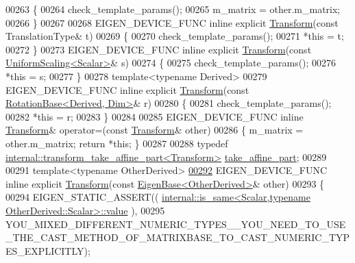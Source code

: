 \begin{DoxyCode}
00263   \{
00264     check\_template\_params();
00265     m\_matrix = other.m\_matrix;
00266   \}
00267 
00268   EIGEN\_DEVICE\_FUNC \textcolor{keyword}{inline} \textcolor{keyword}{explicit} \hyperlink{group___geometry___module_class_eigen_1_1_transform}{Transform}(\textcolor{keyword}{const} TranslationType& t)
00269   \{
00270     check\_template\_params();
00271     *\textcolor{keyword}{this} = t;
00272   \}
00273   EIGEN\_DEVICE\_FUNC \textcolor{keyword}{inline} \textcolor{keyword}{explicit} \hyperlink{group___geometry___module_class_eigen_1_1_transform}{Transform}(\textcolor{keyword}{const} 
      \hyperlink{class_eigen_1_1_uniform_scaling}{UniformScaling<Scalar>}& s)
00274   \{
00275     check\_template\_params();
00276     *\textcolor{keyword}{this} = s;
00277   \}
00278   \textcolor{keyword}{template}<\textcolor{keyword}{typename} Derived>
00279   EIGEN\_DEVICE\_FUNC \textcolor{keyword}{inline} \textcolor{keyword}{explicit} \hyperlink{group___geometry___module_class_eigen_1_1_transform}{Transform}(\textcolor{keyword}{const} 
      \hyperlink{class_eigen_1_1_rotation_base}{RotationBase<Derived, Dim>}& r)
00280   \{
00281     check\_template\_params();
00282     *\textcolor{keyword}{this} = r;
00283   \}
00284 
00285   EIGEN\_DEVICE\_FUNC \textcolor{keyword}{inline} \hyperlink{group___geometry___module_class_eigen_1_1_transform}{Transform}& operator=(\textcolor{keyword}{const} \hyperlink{group___geometry___module_class_eigen_1_1_transform}{Transform}& other)
00286   \{ m\_matrix = other.m\_matrix; \textcolor{keywordflow}{return} *\textcolor{keyword}{this}; \}
00287 
00288   \textcolor{keyword}{typedef} \hyperlink{struct_eigen_1_1internal_1_1transform__take__affine__part}{internal::transform\_take\_affine\_part<Transform>} 
      \hyperlink{struct_eigen_1_1internal_1_1transform__take__affine__part}{take\_affine\_part};
00289 
00291   \textcolor{keyword}{template}<\textcolor{keyword}{typename} OtherDerived>
\hyperlink{group___geometry___module_a5ee8b0067f6dadc04684be504e11a0c3}{00292}   EIGEN\_DEVICE\_FUNC \textcolor{keyword}{inline} \textcolor{keyword}{explicit} \hyperlink{group___geometry___module_a5ee8b0067f6dadc04684be504e11a0c3}{Transform}(\textcolor{keyword}{const} 
      \hyperlink{group___core___module_struct_eigen_1_1_eigen_base}{EigenBase<OtherDerived>}& other)
00293   \{
00294     EIGEN\_STATIC\_ASSERT((
      \hyperlink{struct_eigen_1_1internal_1_1is__same}{internal::is\_same<Scalar,typename OtherDerived::Scalar>::value}
      ),
00295       
      YOU\_MIXED\_DIFFERENT\_NUMERIC\_TYPES\_\_YOU\_NEED\_TO\_USE\_THE\_CAST\_METHOD\_OF\_MATRIXBASE\_TO\_CAST\_NUMERIC\_TYPES\_EXPLICITLY);

\end{DoxyCode}
